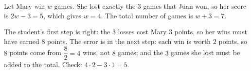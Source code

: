 Let Mary win $w$ games. She lost exactly the $3$ games that Juan won, so her score is $2w-3=5$, which gives $w=4$. The total number of games is $w+3=\boxed{7}$.

The student's first step is right: the $3$ losses cost Mary $3$ points, so her wins must have earned $8$ points. The error is in the next step: each win is worth $2$ points, so $8$ points come from $\dfrac{8}{2}=4$ wins, not $8$ games; and the $3$ games she lost must be added to the total. Check: $4\cdot2-3\cdot1=5$.
